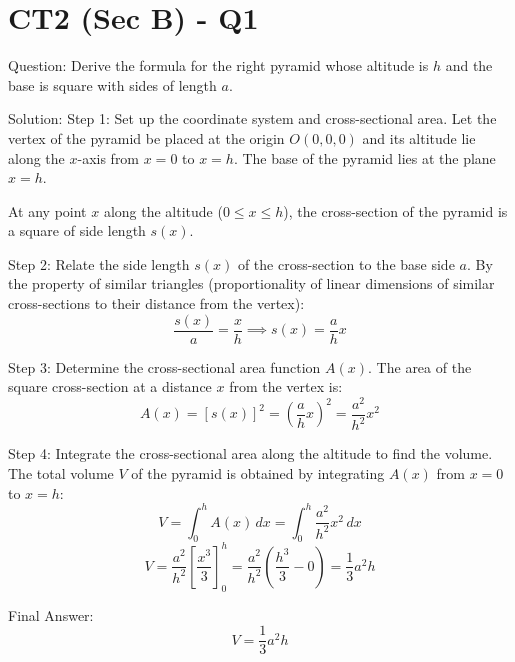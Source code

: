\documentclass{article}
\begin{document}
\section*{CT2 (Sec B) - Q1}
Question:
Derive the formula for the right pyramid whose altitude is $h$ and the base is square with sides of length $a$.

Solution:
Step 1: Set up the coordinate system and cross-sectional area.
Let the vertex of the pyramid be placed at the origin $O(0,0,0)$ and its altitude lie along the $x$-axis from $x = 0$ to $x = h$. The base of the pyramid lies at the plane $x = h$.

At any point $x$ along the altitude ($0 \le x \le h$), the cross-section of the pyramid is a square of side length $s(x)$.

Step 2: Relate the side length $s(x)$ of the cross-section to the base side $a$.
By the property of similar triangles (proportionality of linear dimensions of similar cross-sections to their distance from the vertex):
\[
\frac{s(x)}{a} = \frac{x}{h} \implies s(x) = \frac{a}{h}x
\]

Step 3: Determine the cross-sectional area function $A(x)$.
The area of the square cross-section at a distance $x$ from the vertex is:
\[
A(x) = [s(x)]^2 = \left(\frac{a}{h}x\right)^2 = \frac{a^2}{h^2} x^2
\]

Step 4: Integrate the cross-sectional area along the altitude to find the volume.
The total volume $V$ of the pyramid is obtained by integrating $A(x)$ from $x = 0$ to $x = h$:
\[
V = \int_{0}^{h} A(x) \, dx = \int_{0}^{h} \frac{a^2}{h^2} x^2 \, dx
\]
\[
V = \frac{a^2}{h^2} \left[ \frac{x^3}{3} \right]_{0}^{h} = \frac{a^2}{h^2} \left( \frac{h^3}{3} - 0 \right) = \frac{1}{3} a^2 h
\]

Final Answer:
\[
\boxed{V = \frac{1}{3}a^2h}
\]

\end{document}
